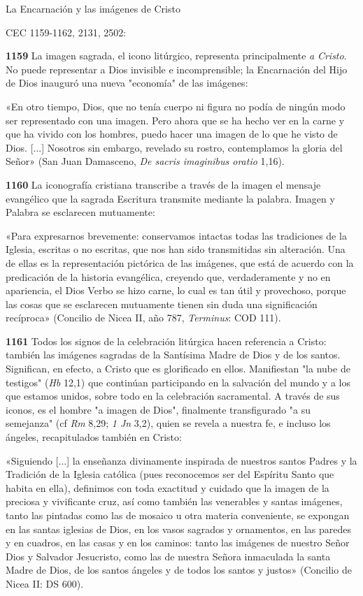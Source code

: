 \documentclass[]{article}
\begin{document}
La Encarnación y las imágenes de Cristo

CEC 1159-1162, 2131, 2502:

\textbf{1159} La imagen sagrada, el icono litúrgico, representa
principalmente \emph{a} \emph{Cristo}. No puede representar a Dios
invisible e incomprensible; la Encarnación del Hijo de Dios inauguró una
nueva "economía" de las imágenes:

«En otro tiempo, Dios, que no tenía cuerpo ni figura no podía de ningún
modo ser representado con una imagen. Pero ahora que se ha hecho ver en
la carne y que ha vivido con los hombres, puedo hacer una imagen de lo
que he visto de Dios. {[}...{]} Nosotros sin embargo, revelado su
rostro, contemplamos la gloria del Señor» (San Juan Damasceno, \emph{De
sacris imaginibus oratio} 1,16).

\textbf{1160} La iconografía cristiana transcribe a través de la imagen
el mensaje evangélico que la sagrada Escritura transmite mediante la
palabra. Imagen y Palabra se esclarecen mutuamente:

«Para expresarnos brevemente: conservamos intactas todas las tradiciones
de la Iglesia, escritas o no escritas, que nos han sido transmitidas sin
alteración. Una de ellas es la representación pictórica de las imágenes,
que está de acuerdo con la predicación de la historia evangélica,
creyendo que, verdaderamente y no en apariencia, el Dios Verbo se hizo
carne, lo cual es tan útil y provechoso, porque las cosas que se
esclarecen mutuamente tienen sin duda una significación recíproca»
(Concilio de Nicea II, año 787, \emph{Terminus}: COD 111).

\textbf{1161} Todos los signos de la celebración litúrgica hacen
referencia a Cristo: también las imágenes sagradas de la Santísima Madre
de Dios y de los santos. Significan, en efecto, a Cristo que es
glorificado en ellos. Manifiestan "la nube de testigos" (\emph{Hb} 12,1)
que continúan participando en la salvación del mundo y a los que estamos
unidos, sobre todo en la celebración sacramental. A través de sus
iconos, es el hombre "a imagen de Dios", finalmente transfigurado "a su
semejanza" (cf \emph{Rm} 8,29; \emph{1 Jn} 3,2), quien se revela a
nuestra fe, e incluso los ángeles, recapitulados también en Cristo:

«Siguiendo {[}...{]} la enseñanza divinamente inspirada de nuestros
santos Padres y la Tradición de la Iglesia católica (pues reconocemos
ser del Espíritu Santo que habita en ella), definimos con toda exactitud
y cuidado que la imagen de la preciosa y vivificante cruz, así como
también las venerables y santas imágenes, tanto las pintadas como las de
mosaico u otra materia conveniente, se expongan en las santas iglesias
de Dios, en los vasos sagrados y ornamentos, en las paredes y en
cuadros, en las casas y en los caminos: tanto las imágenes de nuestro
Señor Dios y Salvador Jesucristo, como las de nuestra Señora inmaculada
la santa Madre de Dios, de los santos ángeles y de todos los santos y
justos» (Concilio de Nicea II: DS 600).
\end{document}
